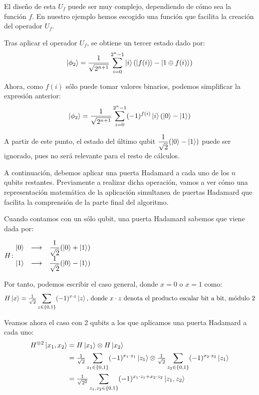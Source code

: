 El diseño de esta $U_f$ puede ser muy complejo, dependiendo de cómo sea la función $f$. En nuestro ejemplo hemos escogido una función que facilita la creación del operador $U_f$.

Tras aplicar el operador $U_f$, se obtiene un tercer estado dado por:
\begin{equation}
\left|\phi_2\right\rangle = \dfrac{1}{\sqrt{2^{n+1}}} \sum\limits_{i=0}^{2^n - 1} \left|i\right\rangle(\left|f(i)\right\rangle-\left|1\oplus f(i)\right\rangle) 
\end{equation}

Ahora, como $f(i)$ sólo puede tomar valores binarios, podemos simplificar la expresión anterior:
\begin{equation}
\left|\phi_2\right\rangle = \dfrac{1}{\sqrt{2^{n+1}}} \sum\limits_{i=0}^{2^n - 1} (-1)^{f(i)}\left|i\right\rangle(\left|0\right\rangle-\left|1\right\rangle) 
\label{phi2}
\end{equation}


A partir de este punto, el estado del último qubit $\dfrac{1}{\sqrt{2}}(\left|0\right\rangle-\left|1\right\rangle)$ puede ser ignorado, pues no será relevante para el resto de cálculos.

A continuación, debemos aplicar una puerta Hadamard a cada uno de los $n$ qubits restantes. Previamente a realizar dicha operación, vamos a ver cómo una representación matemática de la aplicación simultanea de puertas Hadamard que facilita la comprensión de la parte final del algoritmo.

Cuando contamos con un sólo qubit, una puerta Hadamard sabemos que viene dada por: \begin{center}
$H\colon \begin{matrix}\left|0\right\rangle&\longrightarrow& \dfrac{1}{\sqrt{2}}(\left|0\right\rangle+\left|1\right\rangle)\\ \left|1\right\rangle&\longrightarrow& \dfrac{1}{\sqrt{2}}(\left|0\right\rangle-\left|1\right\rangle)\end{matrix}$
\end{center}

Por tanto, podemos escribir el caso general, donde $x=0$ o $x=1$ como:
\begin{equation}
H\left|x\right\rangle = \tfrac{1}{\sqrt{2}}\sum\limits_{z\in\{0,1\}} (-1)^{x\cdot z}\left|z\right\rangle \textrm{, donde $x\cdot z$ denota el producto escalar bit a bit, módulo 2}
\end{equation}

Veamos ahora el caso con 2 qubits a los que aplicamos una puerta Hadamard a cada uno:
\begin{equation}
\begin{split}
H^{\otimes 2}\left|x_1,x_2\right\rangle & = H\left|x_1\right\rangle \otimes H\left|x_2\right\rangle \\
& = \tfrac{1}{\sqrt{2}}\sum\limits_{z_1\in\{0,1\}} (-1)^{x_1\cdot z_1}\left|z_1\right\rangle \otimes \tfrac{1}{\sqrt{2}}\sum\limits_{z_2\in\{0,1\}} (-1)^{x_2\cdot z_2}\left|z_1\right\rangle \\
& = \tfrac{1}{\sqrt{2^2}}\sum\limits_{z_1,z_2\in\{0,1\}} (-1)^{x_1\cdot z_1+x_2\cdot z_2}\left|z_1,z_2\right\rangle
\end{split}
\end{equation}

